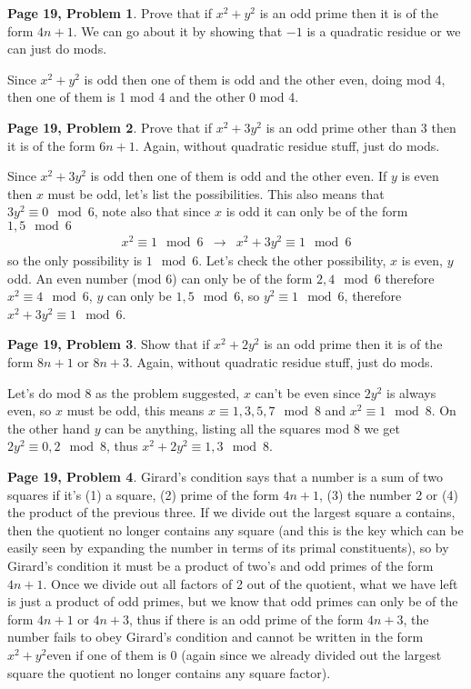 \documentclass[aps,preprint,preprintnumbers,nofootinbib,showpacs,prd]{revtex4-1}
\newcommand{\nbea}{\begin{eqnarray*}}
\newcommand{\neea}{\end{eqnarray*}}
\begin{document}
{\bf Page 19, Problem 1}. Prove that if $x^2 + y^2$ is an odd prime then it is of the form $4n + 1$. We can go about it by showing that $-1$ is a quadratic residue or we can just do mods.

Since $x^2 + y^2$ is odd then one of them is odd and the other even, doing mod 4, then one of them is 1 mod 4 and the other 0 mod 4.

{\bf Page 19, Problem 2}. Prove that if $x^2 + 3y^2$ is an odd prime other than 3 then it is of the form $6n + 1$. Again, without quadratic residue stuff, just do mods. 

Since $x^2 + 3y^2$ is odd then one of them is odd and the other even. If $y$ is even then $x$ must be odd, let's list the possibilities. This also means that $3y^2 \equiv 0 \mod{6}$, note also that since $x$ is odd it can only be of the form $1,5 \mod{6}$
%
\nbea
x^2 \equiv 1 \mod{6} & \to & x^2 + 3y^2 \equiv 1 \mod{6}
\neea
%
so the only possibility is $1 \mod{6}$. Let's check the other possibility, $x$ is even, $y$ odd. An even number (mod 6) can only be of the form $2,4 \mod{6}$ therefore $x^2 \equiv 4 \mod{6}$, $y$ can only be $1,5 \mod{6}$, so $y^2 \equiv 1 \mod{6}$, therefore $x^2 + 3y^2 \equiv 1 \mod{6}$.

{\bf Page 19, Problem 3}. Show that if $x^2 + 2y^2$ is an odd prime then it is of the form $8n + 1$ or $8n + 3$. Again, without quadratic residue stuff, just do mods.

Let's do mod 8 as the problem suggested, $x$ can't be even since $2y^2$ is always even, so $x$ must be odd, this means $x \equiv 1,3,5,7 \mod{8}$ and $x^2 \equiv 1 \mod{8}$. On the other hand $y$ can be anything, listing all the squares mod 8 we get $2y^2 \equiv 0,2 \mod{8}$, thus $x^2 + 2y^2 \equiv 1,3 \mod{8}$.

{\bf Page 19, Problem 4}. Girard's condition says that a number is a sum of two squares if it's (1) a square, (2) prime of the form $4n + 1$, (3) the number 2 or (4) the product of the previous three. If we divide out the largest square a contains, then the quotient no longer contains any square (and this is the key which can be easily seen by expanding the number in terms of its primal constituents), so by Girard's condition it must be a product of two's and odd primes of the form $4n + 1$. Once we divide out all factors of 2 out of the quotient, what we have left is just a product of odd primes, but we know that odd primes can only be of the form $4n+1$ or $4n+3$, thus if there is an odd prime of the form $4n + 3$, the number fails to obey Girard's condition and cannot be written in the form $x^2 + y^2$even if one of them is 0 (again since we already divided out the largest square the quotient no longer contains any square factor).
\end{document}
